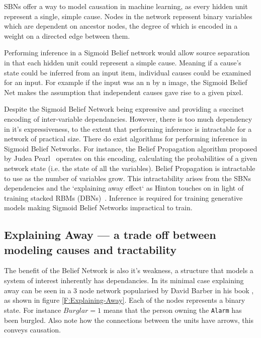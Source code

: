     SBNs offer a way to model causation in machine learning, as every hidden unit represent a single, simple cause. Nodes in the network represent binary variables which are dependent on ancestor nodes, the degree of which is encoded in a weight on a directed edge between them.

    Performing inference in a Sigmoid Belief network would allow source separation in that each hidden unit could represent a simple cause. Meaning if a cause's state could be inferred from an input item, individual causes could be examined for an input. For example if the input was an n by n image, the Sigmoid Belief Net makes the assumption that independent causes gave rise to a given pixel.

    Despite the Sigmoid Belief Network being expressive and providing a succinct encoding of inter-variable dependancies. However, there is too much dependency in it's expressiveness, to the extent that performing inference is intractable for a network of practical size. There do exist algorithms for performing inference in Sigmoid Belief Networks. For instance, the Belief Propagation algorithm proposed by Judea Pearl~\cite{Pearl1982} operates on this encoding, calculating the probabilities of a given network state (i.e. the state of all the variables).  Belief Propagation is intractable to use as the number of variables grow. This intractability arises from the SBNs dependencies and the `explaining away effect` as Hinton touches on in light of training stacked RBMs (DBNs)~\cite{Hinton:2006:FLA:1161603.1161605}. Inference is required for training generative models making Sigmoid Belief Networks impractical to train.

    \subsection{Explaining Away --- a trade off between modeling causes and tractability}\label{SS:Explaining-Away}

    The benefit of the Belief Network is also it's weakness, a structure that models a system of interest inherently has dependancies. In its minimal case explaining away can be seen in a 3 node network popularised by David Barber in his book \cite{Barber:2012:BRM:2207809}, as shown in figure \ref{F:Explaining-Away}. Each of the nodes represents a binary state. For instance $Burglar = 1$ means that the person owning the \texttt{Alarm} has been burgled. Also note how the connections between the units have arrows, this conveys causation.


